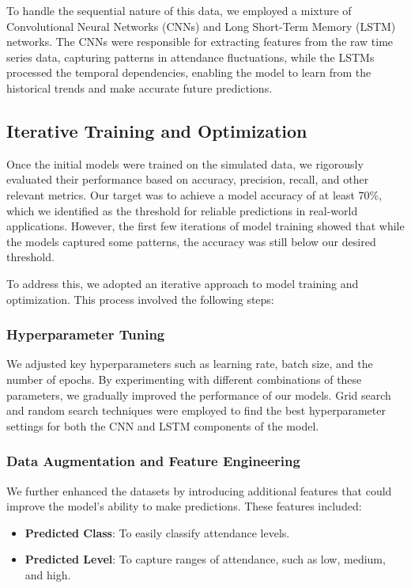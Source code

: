 \documentclass[11pt,a4paper]{article}
\begin{document}
To handle the sequential nature of this data, we employed a mixture of Convolutional Neural Networks (CNNs) and Long Short-Term Memory (LSTM) networks. 
The CNNs were responsible for extracting features from the raw time series data, capturing patterns in attendance fluctuations, 
while the LSTMs processed the temporal dependencies, enabling the model to learn from the historical trends and make accurate future predictions.

\subsection*{Iterative Training and Optimization}
Once the initial models were trained on the simulated data, we rigorously evaluated their performance based on accuracy, precision, recall, 
and other relevant metrics. 
Our target was to achieve a model accuracy of at least 70\%, 
which we identified as the threshold for reliable predictions in real-world applications. 
However, the first few iterations of model training showed that while the models captured some patterns, the accuracy was still below our desired threshold.

To address this, we adopted an iterative approach to model training and optimization. This process involved the following steps:

\subsubsection*{Hyperparameter Tuning}
We adjusted key hyperparameters such as learning rate, batch size, and the number of epochs. 
By experimenting with different combinations of these parameters, we gradually improved the performance of our models. 
Grid search and random search techniques were employed to find the best hyperparameter settings for both the CNN and LSTM components of the model.

\subsubsection*{Data Augmentation and Feature Engineering}
We further enhanced the datasets by introducing additional features that could improve the model's ability to make predictions. These features included:
\begin{itemize}
    \item \textbf{Predicted Class}: To easily classify attendance levels.
    \item \textbf{Predicted Level}: To capture ranges of attendance, such as low, medium, and high.
\end{itemize}
\end{document}
